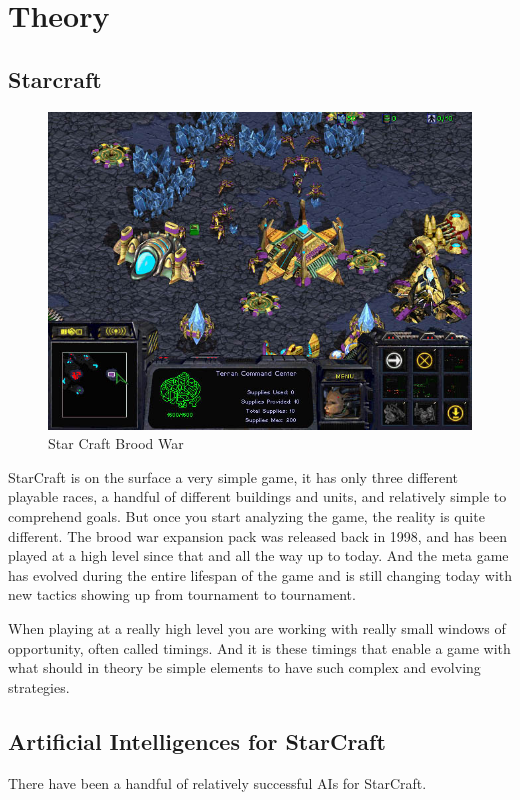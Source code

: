 
\chapter{Theory}
\section{Starcraft}

\begin{figure}[h!tb]
\centering
\includegraphics[scale=0.5]{graphics/scbw.jpg}
\caption{Star Craft Brood War \cite{test}}
\label{fig:scbwIntro}
\end{figure}
StarCraft is on the surface a very simple game, it has only three different playable races, a
handful of different buildings and units, and relatively simple to comprehend
goals. But once you start analyzing the game, the reality is quite different. The brood war expansion pack was released back in 1998, and has been played at a high level since that and all the way up to today. And the meta game has evolved during the entire lifespan of the game and is still changing today with new tactics showing up from tournament to tournament.

When playing at a really high level you are working with really small windows of opportunity, often called timings. And it is these timings that enable a game with what should in theory be simple elements to have such complex and evolving strategies. 

\section{Artificial Intelligences for StarCraft}
There have been a handful of relatively successful AIs for StarCraft.

